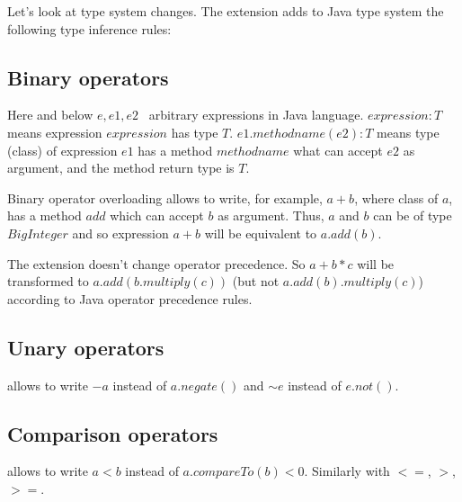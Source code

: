 \documentclass{aircc}
\begin{document}
Let's look at type system changes. 
The extension adds to Java type system the following type inference rules:

\subsection{Binary operators}
Here and below $e,e1,e2$ \textemdash~arbitrary expressions in Java language.
$expression : T$ means expression $expression$ has type $T$.
$e1.methodname(e2) : T$ means type (class) of expression $e1$ has a method $methodname$ what can accept $e2$ as argument,
and the method return type is $T$.

Binary operator overloading allows to write, for example, $a + b$, 
where class of $a$, has a method $add$ which can accept $b$ as argument.
Thus, $a$ and $b$ can be of type $BigInteger$ and so expression $a+b$ will be equivalent to $a.add(b)$. 

The extension doesn't change operator precedence. So $a+b*c$ will be transformed to $a.add(b.multiply(c))$ (but not $a.add(b).multiply(c)$) according to Java operator precedence rules.

\subsection{Unary operators}
allows to write $-a$ instead of $a.negate()$ and $\sim e$ instead of $e.not()$.

\subsection{Comparison operators}
\begin{mathpar}
\end{mathpar}
allows to write $a<b$ instead of $a.compareTo(b) < 0$. Similarly with $<=$, $>$, $>=$.
\end{document}

